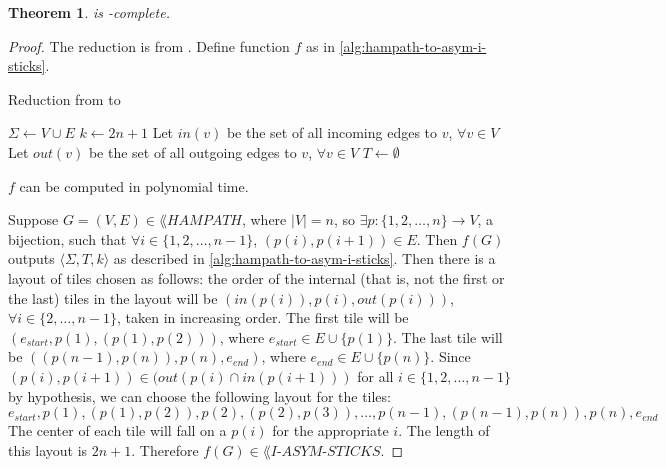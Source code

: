 \documentclass[draft]{article}
\newtheorem{theorem}{Theorem}[section]
\theoremstyle{definition} \newtheorem{definition}[definition]{Definition}
\theoremstyle{definition} \newreptheorem{definition}{Definition}
\newcommand{\dash}{\mbox{-}}
\newcommand{\triple}[3]{\langle#1,#2,#3\rangle} %
\newcommand{\aisticks}{I\dash ASYM\dash STICKS}
\begin{document}
  \begin{theorem}\label{thm:asym-i-sticks-npc}
    \lang{\aisticks} is \NP-complete.
  \end{theorem}
  \begin{proof}
    The reduction is from . Define function $f$ as in
    \autoref{alg:hampath-to-asym-i-sticks}.
    \begin{algorithm}\label{alg:hampath-to-asym-i-sticks}
      \caption{Reduction from  to \lang{\aisticks}}
      $\Sigma\gets V\cup E$\;
      $k\gets 2n+1$\;
      Let $in(v)$ be the set of all incoming edges to $v$, $\forall v\in V$\;
      Let $out(v)$ be the set of all outgoing edges to $v$, $\forall v\in V$\;
      $T\gets\emptyset$\;
      \Return{$\triple{\Sigma}{T}{k}$}
    \end{algorithm}
    $f$ can be computed in polynomial time.

    Suppose $G=(V,E)\in\lang{HAMPATH}$, where $|V| = n$, so $\exists
    p\colon\{1,2,\ldots,n\}\to V$, a bijection, such that $\forall
    i\in\{1,2,\ldots,n-1\}$, $(p(i), p(i+1))\in E$. Then $f(G)$ outputs
    $\triple{\Sigma}{T}{k}$ as described in
    \autoref{alg:hampath-to-asym-i-sticks}. Then there is a layout of tiles
    chosen as follows: the order of the internal (that is, not the first or the
    last) tiles in the layout will be $(in(p(i)), p(i), out(p(i)))$, $\forall
    i\in\{2,\ldots, n-1\}$, taken in increasing order. The first tile will be
    $(e_{start}, p(1), (p(1),p(2)))$, where $e_{start}\in E\cup\{p(1)\}$. The
    last tile will be $((p(n-1), p(n)), p(n), e_{end})$, where $e_{end}\in
    E\cup\{p(n)\}$. Since $(p(i),p(i+1))\in(out(p(i)\cap in(p(i+1)))$ for all
    $i\in\{1,2,\ldots,n-1\}$ by hypothesis, we can choose the following layout
    for the tiles:
    \begin{displaymath}
      e_{start}, p(1), (p(1), p(2)), p(2), (p(2), p(3)), \ldots, p(n-1),
      (p(n-1), p(n)), p(n), e_{end}
    \end{displaymath}
    The center of each tile will fall on a $p(i)$ for the appropriate $i$. The
    length of this layout is $2n+1$. Therefore $f(G)\in\lang{\aisticks}$.


\end{proof}
\end{document}
